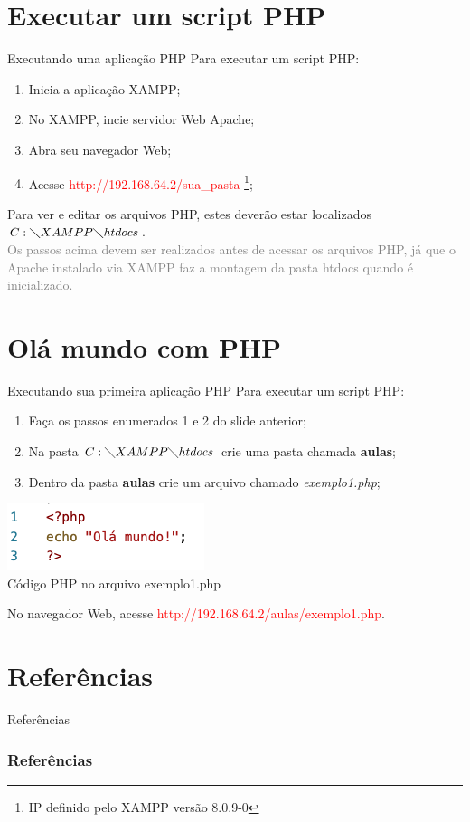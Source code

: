 \documentclass{beamer}
\begin{document}
\section{Executar um script PHP}
\begin{frame}{Executando uma aplicação PHP}
Para executar um script PHP:
\begin{enumerate}
    \item Inicia a aplicação XAMPP;
    \item No XAMPP, incie servidor Web Apache;
    \item Abra seu navegador Web;
    \item Acesse \textcolor{red}{http://192.168.64.2/sua\_pasta} \footnote{IP definido pelo XAMPP versão 8.0.9-0};
\end{enumerate}

Para ver e editar os arquivos PHP, estes deverão estar localizados $C:\diagdown XAMPP\diagdown htdocs$.\\
\vspace{0.5cm}
\textcolor{gray}{Os passos acima devem ser realizados antes de acessar os arquivos PHP, já que o Apache instalado via XAMPP faz a montagem da pasta htdocs quando é inicializado.}

\end{frame}

\section{Olá mundo com PHP}
\begin{frame}{Executando sua primeira aplicação PHP}
Para executar um script PHP:
\begin{enumerate}
    \item Faça os passos enumerados 1 e 2 do slide anterior;
    \item Na pasta $C:\diagdown XAMPP\diagdown htdocs$ crie uma pasta chamada \textbf{aulas}; 
    \item Dentro da pasta \textbf{aulas} crie um arquivo chamado \textit{exemplo1.php};
\end{enumerate}
\begin{center}
    \includegraphics[height=0.2\paperheight]{fig/aula4/php_aula4_2.png}\\
    \tiny{Código PHP no arquivo exemplo1.php}
\end{center}
No navegador Web, acesse \textcolor{red}{http://192.168.64.2/aulas/exemplo1.php}.
\end{frame}
\section{Referências}
\begin{frame}{Referências}%
\frametitle{Referências}
\small
\begin{center}
\tiny


\end{center}
\end{frame}
 
\end{document}
